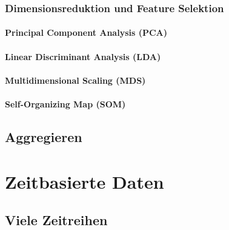             \subsubsection{Dimensionsreduktion und Feature Selektion} %

                \paragraph{Principal Component Analysis (PCA)} %

                \paragraph{Linear Discriminant Analysis (LDA)} %

                \paragraph{Multidimensional Scaling (MDS)} %

                \paragraph{Self-Organizing Map (SOM)} %

        \subsection{Aggregieren} %

    \section{Zeitbasierte Daten} %

        \subsection{Viele Zeitreihen} %

